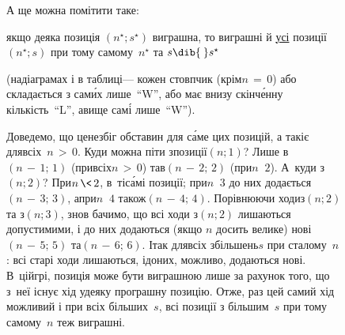 \begin{figure}[!b]
А ще можна помітити таке: \begin{itshape}якщо деяка позиція $(n^{\star};s^{\star})$ виграшна, то виграшні й \underline{усі} позиції $(n^{\star};s)$ при тому самому~$n^{\star}$ та $s\dib{{\>}}s^{\star}$\end{itshape} (на\nolinebreak[2] діаграмах і в таблиці\nolinebreak[3] --- кожен стовпчик (крім\nolinebreak[3] ${n\,{=}\,0}$) або складається з сам\'{и}х лише~``W'', або має внизу скінч\'{е}нну кількість~``L'', а\nolinebreak[3] вище сам\'{і} лише~``W'').

Доведемо, що це\nolinebreak[2] не\nolinebreak[3] збіг обставин для с\'{а}ме цих позицій, а так\nolinebreak[2] і\nolinebreak[2] є для\nolinebreak[3] всіх~${n\,{>}\,0}$. Куди можна піти з\nolinebreak[3] позиції\nolinebreak[3] $(n;1)$? Лише в\nolinebreak[3] ${(n\,{-}\,1;\,1)}$ (при\nolinebreak[2] всіх\nolinebreak[2] ${n\,{>}\,0}$) та\nolinebreak[2] в\nolinebreak[3] ${(n\,{-}\,2;\,2)}$ (при\nolinebreak[2] ${n\,{\>}\,2}$). А~куди з\nolinebreak[3] $(n;2)$? 
При\nolinebreak[2] ${n\,{\<}\,2}$, %
в~ті\nolinebreak[3] с\'{а}мі позиції;
при\nolinebreak[2] ${n\,{\>}\,3}$ до них додається\nolinebreak[3] ${(n\,{-}\,3;\,3)}$,
а\nolinebreak[3] при\nolinebreak[2] ${n\,{\>}\,4}$ також\nolinebreak[3] ${(n\,{-}\,4;\,4)}$.
Порівнюючи ходи\nolinebreak[2] з\nolinebreak[3] $(n;2)$ та з\nolinebreak[3] $(n;3)$, знов бачимо, що всі ходи з\nolinebreak[3] $(n;2)$ лишаються допустимими, і до них додаються (якщо $n$ досить велике) нові ${(n\,{-}\,5;\,5)}$ та\nolinebreak[3] ${(n\,{-}\,6;\,6)}$. І\nolinebreak[3] так для\nolinebreak[2] всіх збільшень\nolinebreak[3] $s$ при сталому~$n$: всі старі ходи лишаються, і\nolinebreak[2] до\nolinebreak[2] них, можливо, додаються нові. 
В~цій\nolinebreak[2] грі, позиція може бути виграшною лише за рахунок того,
що з~неї існує хід у\nolinebreak[2] деяку програшну позицію.
Отже, раз цей самий хід можливий і при всіх більших~$s$, всі позиції з більшим~$s$ при тому самому~$n$ теж виграшні.


\end{figure}
